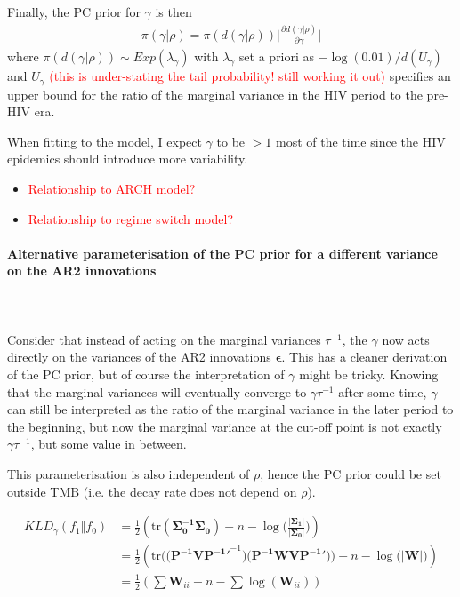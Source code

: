 \documentclass[12pt,a4paper]{article}
\begin{document}
 Finally, the PC prior for $\gamma$ is then
\begin{align*}
\pi(\gamma | \rho) = \pi(d(\gamma | \rho)) \Big\vert \frac{\partial d(\gamma | \rho)}{\partial \gamma} \Big\vert
\end{align*}
where $\pi(d(\gamma | \rho)) \sim Exp (\lambda_{\gamma})$ with $\lambda_{\gamma}$ set a priori as $-\log(0.01) / d(U_{\gamma})$ and $U_{\gamma}$ \textcolor{red}{(this is under-stating the tail probability! still working it out)} specifies an upper bound for the ratio of the marginal variance in the HIV period to the pre-HIV era.

When fitting to the model, I expect $\gamma$ to be $ > 1 $ most of the time since the HIV epidemics should introduce more variability.

\begin{itemize}
\item \textcolor{red}{Relationship to ARCH model?}
\item \textcolor{red}{Relationship to regime switch model?}
\end{itemize}


\paragraph{Alternative parameterisation of the PC prior for a different variance on the AR2 innovations} \\~\\
Consider that instead of acting on the marginal variances $\tau^{-1}$, the $\gamma$ now acts directly on the variances of the AR2 innovations $\boldsymbol{\epsilon}$. This has a cleaner derivation of the PC prior, but of course the interpretation of $\gamma$ might be tricky. Knowing that the marginal variances will eventually converge to $\gamma \tau^{-1}$ after some time, $\gamma$ can still be interpreted as the ratio of the marginal variance in the later period to the beginning, but now the marginal variance at the cut-off point is not exactly $\gamma \tau^{-1}$, but some value in between.

This parameterisation is also independent of $\rho$, hence the PC prior could be set outside TMB (i.e. the decay rate does not depend on $\rho$).

\begin{align*}
KLD_{\gamma}(f_1 \Vert f_0) &= \frac{1}{2} \left( \text{tr}(\boldsymbol{\Sigma_0^{-1} \Sigma_0}) - n - \log\Big(\frac{\vert \boldsymbol{\Sigma_1}\vert}{\vert \boldsymbol{\Sigma_0} \vert}\Big) \right) \\
&= \frac{1}{2} \left( \text{tr} \Big( \big( \boldsymbol{P^{-1}VP^{-1}'}^{-1} \big) \big( \boldsymbol{P^{-1}WVP^{-1}'} \big)  \Big)  - n - \log \Big( \vert \boldsymbol{W} \vert \Big) \right) \\
&= \frac{1}{2}\left( \sum \boldsymbol{W}_{ii} - n - \sum \log(\boldsymbol{W}_{ii}) \right)
\end{align*}
\end{document}
